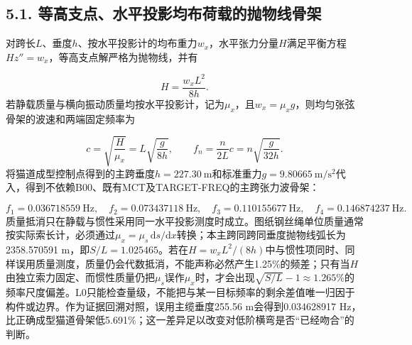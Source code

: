 \documentclass[UTF8,a4paper,11pt,fontset=none]{ctexart}
\begin{document}
\subsection*{5.1. 等高支点、水平投影均布荷载的抛物线骨架}
对跨长\(L\)\allowbreak{}、垂度\(h\)\allowbreak{}、按水平投影计的均布重力\(w_x\)\allowbreak{}，水平张力分量\(H\)\allowbreak{}满足平衡方程\(Hz''=w_x\)\allowbreak{}，等高支点解严格为抛物线，并有\par
\[
H=\frac{w_xL^2}{8h}.
\]
若静载质量与横向振动质量均按水平投影计，记为\(\mu_x\)\allowbreak{}，且\(w_x=\mu_xg\)\allowbreak{}，则均匀张弦骨架的波速和两端固定频率为\par
\[
c=\sqrt{\frac{H}{\mu_x}}
=L\sqrt{\frac{g}{8h}},
\qquad
f_n=\frac{n}{2L}c
=n\sqrt{\frac{g}{32h}}.
\]
将猫道成型控制点得到的主跨垂度\(h=227.30\ \mathrm m\)\allowbreak{}和标准重力\(g=9.80665\ \mathrm{m/s^2}\)\allowbreak{}代入，得到不依赖B00、既有MCT及TARGET-FREQ的主跨张力波骨架：\par
\[
f_1=0.036718559\ \mathrm{Hz},\quad
f_2=0.073437118\ \mathrm{Hz},\quad
f_3=0.110155677\ \mathrm{Hz},\quad
f_4=0.146874237\ \mathrm{Hz}.
\]
质量抵消只在静载与惯性采用同一水平投影测度时成立。图纸钢丝绳单位质量通常按实际索长计，必须通过\(\mu_x=\mu_s\,\allowbreak \mathrm ds/\mathrm dx\)\allowbreak{}转换；本主跨同跨同垂度抛物线弧长为2358.570591 m，即\(S/L=1.025465\)\allowbreak{}。若在\(H=w_xL^2/(8h)\)\allowbreak{}中与惯性项同时、同样误用质量测度，质量仍会代数抵消，不能声称必然产生1.25\%的频差；只有当\(H\)\allowbreak{}由独立索力固定、而惯性质量仍把\(\mu_s\)\allowbreak{}误作\(\mu_x\)\allowbreak{}时，才会出现\(\sqrt{S/L}-1\approx1.265\%\)\allowbreak{}的频率尺度偏差。L0只能检查量级，不能把与某一目标频率的剩余差值唯一归因于构件或边界。作为证据回溯对照，误用主缆垂度255.56 m会得到0.034628917 Hz，比正确成型猫道骨架低5.691\%；这一差异足以改变对低阶横弯是否“已经吻合”的判断。\par
{}
\end{document}

